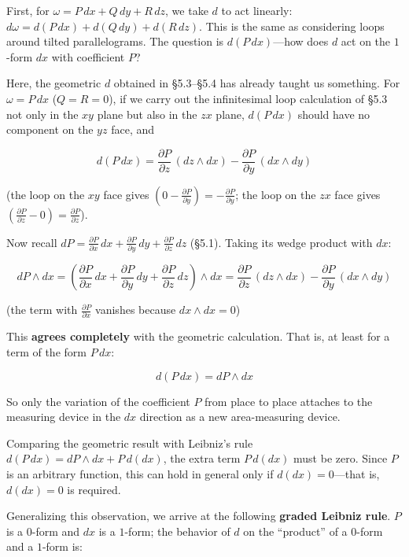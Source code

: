\documentclass[a4paper,12pt,openany]{book}
\begin{document}
First, for \(\omega = P\,dx + Q\,dy + R\,dz\), we take \(d\) to act
linearly: \(d\omega = d(P\,dx) + d(Q\,dy) + d(R\,dz)\). This is the same
as considering loops around tilted parallelograms. The question is
\(d(P\,dx)\)—how does \(d\) act on the \(1\)-form \(dx\) with
coefficient \(P\)?

Here, the geometric \(d\) obtained in §5.3–§5.4 has already taught us
something. For \(\omega = P\,dx\) (\(Q=R=0\)), if we carry out the
infinitesimal loop calculation of §5.3 not only in the \(xy\) plane but
also in the \(zx\) plane, \(d(P\,dx)\) should have no component on the
\(yz\) face, and

\[d(P\,dx) = \frac{\partial P}{\partial z}\,(dz \wedge dx) - \frac{\partial P}{\partial y}\,(dx \wedge dy)\]

(the loop on the \(xy\) face gives
\((0 - \frac{\partial P}{\partial y}) = -\frac{\partial P}{\partial y}\);
the loop on the \(zx\) face gives
\((\frac{\partial P}{\partial z} - 0) = \frac{\partial P}{\partial z}\)).

Now recall
\(dP = \frac{\partial P}{\partial x}\,dx + \frac{\partial P}{\partial y}\,dy + \frac{\partial P}{\partial z}\,dz\)
(§5.1). Taking its wedge product with \(dx\):

\[dP \wedge dx = (\frac{\partial P}{\partial x}\,dx + \frac{\partial P}{\partial y}\,dy + \frac{\partial P}{\partial z}\,dz) \wedge dx = \frac{\partial P}{\partial z}\,(dz \wedge dx) - \frac{\partial P}{\partial y}\,(dx \wedge dy)\]

(the term with \(\frac{\partial P}{\partial x}\) vanishes because
\(dx \wedge dx = 0\))

This \textbf{agrees completely} with the geometric calculation. That is,
at least for a term of the form \(P\,dx\):

\[d(P\,dx) = dP \wedge dx\]

So only the variation of the coefficient \(P\) from place to place
attaches to the measuring device in the \(dx\) direction as a new
area-measuring device.

Comparing the geometric result with Leibniz's rule
\(d(P\,dx) = dP \wedge dx + P\,d(dx)\), the extra term \(P\,d(dx)\) must
be zero. Since \(P\) is an arbitrary function, this can hold in general
only if \(d(dx)=0\)—that is, \(d(dx) = 0\) is required.

Generalizing this observation, we arrive at the following
\textbf{graded Leibniz rule}. \(P\) is a \(0\)-form and \(dx\) is a
\(1\)-form; the behavior of \(d\) on the ``product'' of a \(0\)-form and
a \(1\)-form is:
\end{document}
